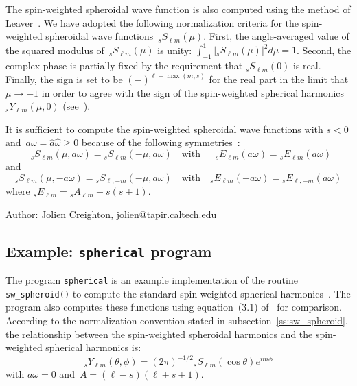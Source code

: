 The spin-weighted spheroidal wave function
is also computed using the method of Leaver~\cite{leaver:1985}.
We have adopted the following normalization criteria for the spin-weighted
spheroidal wave functions~${}_sS_{\ell m}(\mu)$.  First, the angle-averaged
value of the squared modulus of~${}_sS_{\ell m}(\mu)$ is unity:
$\int_{-1}^{1}|{}_sS_{\ell m}(\mu)|^2d\mu=1$.  Second, the complex phase is
partially fixed by the requirement that ${}_sS_{\ell m}(0)$ is real.
Finally, the sign is set to be $(-)^{\ell-\max(m,s)}$ for the real part
in the limit that
$\mu\to-1$ in order to agree with the sign of the spin-weighted spherical
harmonics~${}_sY_{\ell m}(\mu,0)$ (see~\cite{goldberg:1967}).

It is sufficient to compute the spin-weighted spheroidal wave functions
with $s<0$ and~$a\omega=\hat{a}\hat{\omega}\ge0$ because of the following
symmetries~\cite{press:1973}:
\begin{equation}
  {}_{-s}S_{\ell m}(\mu,a\omega) = {}_sS_{\ell m}(-\mu,a\omega)
  \quad {\textrm{with}} \quad
  {}_{-s}E_{\ell m}(a\omega) = {}_sE_{\ell m}(a\omega)
\end{equation}
and
\begin{equation}
  {}_sS_{\ell m}(\mu,-a\omega) = {}_sS_{\ell,-m}(-\mu,a\omega)
  \quad {\textrm{with}} \quad
  {}_sE_{\ell m}(-a\omega) = {}_sE_{\ell,-m}(a\omega)
\end{equation}
where ${}_sE_{\ell m}={}_sA_{\ell m}+s(s+1)$.

\begin{description}
\item{Author:} Jolien Creighton, jolien@tapir.caltech.edu
\end{description}


\clearpage
\subsection{Example: \texttt{spherical} program}

The program \texttt{spherical} is an example implementation of the
routine \texttt{sw\_spheroid()} to compute the standard spin-weighted
spherical harmonics~\cite{goldberg:1967}.  The program also computes these
functions using equation~(3.1) of~\cite{goldberg:1967} for comparison.
According to the normalization convention stated in
subsection~\ref{ss:sw_spheroid}, the relationship between the spin-weighted
spheroidal harmonics and the spin-weighted spherical harmonics is:
\begin{equation}
  {}_sY_{\ell m}(\theta,\phi) =
    (2\pi)^{-1/2}{}_sS_{\ell m}(\cos\theta)e^{im\phi}
\end{equation}
with $a\omega=0$ and~$A=(\ell-s)(\ell+s+1)$.

